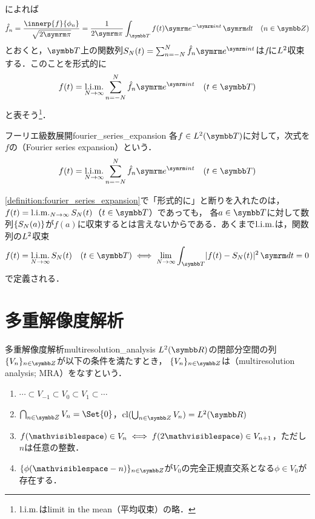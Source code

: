 \documentclass[../../main]{subfiles}
\begin{document}
によれば
\[
  \hat{f}_n = \frac{\innerp{f}{\phi_n}}{\sqrt{2\krez}}
  = \frac{1}{2\krez}\int_{\torus}f(t)\napr^{-\iuni nt}\intd{t}\quad(n\in\numset{Z})
\]
とおくと，\(\torus\)上の関数列\(S_N(t)=\sum_{n=-N}^N\hat{f}_n\napr^{\iuni nt}\)は\(f\)に\(\Lebesgue{2}\)収束する．このことを形式的に
\[
  f(t) = \sqlim_{N\to\infty}\sum_{n=-N}^N\hat{f}_n\napr^{\iuni nt}\quad(t\in\torus)
\]
と表そう\footnote{\(\operatorname*{l{.}i{.}m{.}}\)はlimit in the mean（平均収束）の略．}．

\begin{definition}{フーリエ級数展開}{fourier_series_expansion}
  各\(f\in\Lebesgue{2}(\torus)\)に対して，次式を\(f\)の（Fourier series expansion）という．
  \[
    f(t) = \sqlim_{N\to\infty}\sum_{n=-N}^N\hat{f}_n\napr^{\iuni nt}\quad(t\in\torus)
  \]
\end{definition}

\begin{note}
  \cref{definition:fourier_series_expansion}で「形式的に」と断りを入れたのは，\(f(t)=\operatorname*{l{.}i{.}m{.}}_{N\to\infty}S_N(t)\)（\(t\in\torus\)）であっても，
  各\(a\in\torus\)に対して数列\(\lbrace S_N(a)\rbrace\)が\(f(a)\)に収束するとは言えないからである．あくまで\(\operatorname*{l{.}i{.}m{.}}\)は，関数列の\(\Lebesgue{2}\)収束
  \[
    f(t)=\sqlim_{N\to\infty}S_N(t)\quad(t\in\torus)
    \iff\lim_{N\to\infty}\int_{\torus}\abs{f(t)-S_N(t)}^2\intd{t} = 0
  \]
  で定義される．
\end{note}

\section{多重解像度解析}

\begin{definition}{多重解像度解析}{multiresolution_analysis}
  \(\Lebesgue{2}(\numset{R})\)の閉部分空間の列\(\seq{V_n}_{n\in\numset{Z}}\)が以下の条件を満たすとき，
  \(\seq{V_n}_{n\in\numset{Z}}\)は（multiresolution analysis; MRA）をなすという．
  \begin{enumerate}
    \item \(\dotsb\subset V_{-1}\subset V_0\subset V_1\subset\dotsb\)
    \item \(\bigcap_{n\in\numset{Z}}V_n=\Set{0}\)，\(\clsr(\bigcup_{n\in\numset{Z}}V_n)=\Lebesgue{2}(\numset{R})\)
    \item \(f(\holder)\in V_n\iff f(2\holder)\in V_{n+1}\)，ただし\(n\)は任意の整数．
    \item \(\seq{\phi(\holder-n)}_{n\in\numset{Z}}\)が\(V_0\)の完全正規直交系となる\(\phi\in V_0\)が存在する．
  \end{enumerate}
\end{definition}
\end{document}
